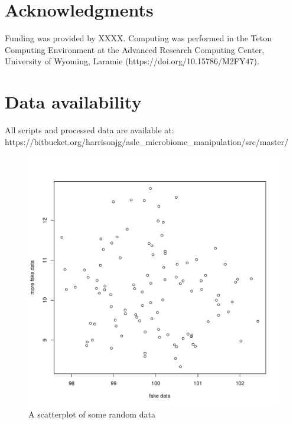 \documentclass[letterpaper, 12pt]{article}
\begin{document}
\begin{linenumbers}
\section*{Acknowledgments}
Funding was provided by XXXX. Computing was performed in the Teton Computing Environment at the Advanced Research Computing Center, University of Wyoming, Laramie (https://doi.org/10.15786/M2FY47).

\section*{Data availability}
All scripts and processed data are available at:
https://bitbucket.org/harrisonjg/asle\_microbiome\_manipulation/src/master/ 

\end{linenumbers}






\pagebreak
\begin{figure}[H]
    \centering
    \includegraphics[width=0.9\linewidth]{./results/scatterplot.pdf}
  \captionsetup{width=0.75\textwidth}
  \caption{A scatterplot of some random data}
    	\label{fig:scatterplot} %
\end{figure}
\end{document}
